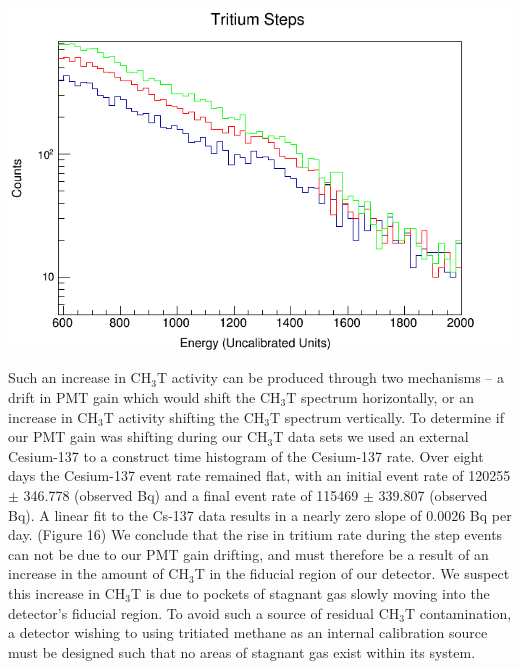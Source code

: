 \documentclass[a4paper,12pt]{article}
\begin{document}
\begin{center}
\includegraphics[scale=0.5]{Steps_Overlay.png}
\end{center}

Such an increase in CH$_3$T activity can be produced through two mechanisms -- a drift in PMT gain which would shift the CH$_3$T spectrum horizontally, or an increase in CH$_3$T activity shifting the CH$_3$T spectrum vertically.  To determine if our PMT gain was shifting during our CH$_3$T data sets we used an external Cesium-137 to a construct time histogram of the Cesium-137 rate.  Over eight days the Cesium-137 event rate remained flat, with an initial event rate of 120255 $\pm$ 346.778 (observed Bq) and a final event rate of 115469 $\pm$ 339.807 (observed Bq).  A linear fit to the Cs-137 data results in a nearly zero slope of 0.0026 Bq per day.  (Figure 16) We conclude that the rise in tritium rate during the step events can not be due to our PMT gain drifting, and must therefore be a result of an increase in the amount of CH$_3$T in the fiducial region of our detector.  We suspect this increase in CH$_3$T is due to pockets of stagnant gas slowly moving into the detector's fiducial region.  To avoid such a source of residual CH$_3$T contamination, a detector wishing to using tritiated methane as an internal calibration source must be designed such that no areas of stagnant gas exist within its system.
\end{document}
